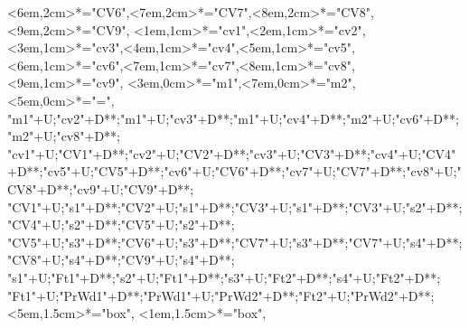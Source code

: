 \begin{multicols}{2}
\begin{exe}
{\begin{xlist}
{		<6em,2cm>*="CV6",<7em,2cm>*="CV7",<8em,2cm>*="CV8",<9em,2cm>*="CV9",
		<1em,1cm>*="cv1",<2em,1cm>*="cv2",<3em,1cm>*="cv3",<4em,1cm>*="cv4",<5em,1cm>*="cv5",
		<6em,1cm>*="cv6",<7em,1cm>*\as{ }="cv7",<8em,1cm>*="cv8",<9em,1cm>*\as{ }="cv9",
		<3em,0cm>*="m1",<7em,0cm>*="m2",<5em,0cm>*\as{=}="=",
		"m1"+U;"cv2"+D**\dir{-};"m1"+U;"cv3"+D**\dir{-};"m1"+U;"cv4"+D**\dir{-};"m2"+U;"cv6"+D**\dir{-};"m2"+U;"cv8"+D**\dir{-};
		"cv1"+U;"CV1"+D**\dir{-};"cv2"+U;"CV2"+D**\dir{-};"cv3"+U;"CV3"+D**\dir{-};"cv4"+U;"CV4"+D**\dir{-};"cv5"+U;"CV5"+D**\dir{-};"cv6"+U;"CV6"+D**\dir{-};"cv7"+U;"CV7"+D**\dir{};"cv8"+U;"CV8"+D**\dir{-};"cv9"+U;"CV9"+D**\dir{};
		"CV1"+U;"s1"+D**\dir{-};"CV2"+U;"s1"+D**\dir{-};"CV3"+U;"s1"+D**\dir{-};"CV3"+U;"s2"+D**\dir{-};"CV4"+U;"s2"+D**\dir{-};"CV5"+U;"s2"+D**\dir{-};
		"CV5"+U;"s3"+D**\dir{-};"CV6"+U;"s3"+D**\dir{-};"CV7"+U;"s3"+D**\dir{-};"CV7"+U;"s4"+D**\dir{-};"CV8"+U;"s4"+D**\dir{-};"CV9"+U;"s4"+D**\dir{-};
		"s1"+U;"Ft1"+D**\dir{-};"s2"+U;"Ft1"+D**\dir{-};"s3"+U;"Ft2"+D**\dir{-};"s4"+U;"Ft2"+D**\dir{-};
		"Ft1"+U;"PrWd1"+D**\dir{-};"PrWd1"+U;"PrWd2"+D**\dir{-};"Ft2"+U;"PrWd2"+D**\dir{-};
		<5em,1.5cm>*="box",
		<1em,1.5cm>*="box",
	\endxy}\label{as:uimg=ee2}
	\end{xlist}}
\end{exe}
\end{multicols}

